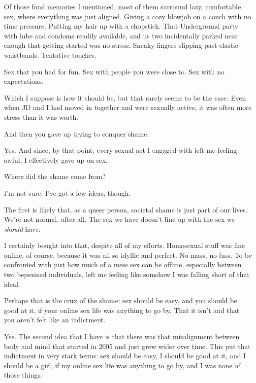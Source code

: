 Of those fond memories I mentioned, most of them surround lazy, comfortable sex, where everything was just aligned. Giving a cozy blowjob on a couch with no time pressure. Putting my hair up with a chopstick. That Underground party with lube and condoms readily available, and us two incidentally parked near enough that getting started was no stress. Sneaky fingers slipping past elastic waistbands. Tentative touches.

\begin{ally}
Sex that you had for fun. Sex with people you were close to. Sex with no expectations.
\end{ally}
Which I suppose is how it should be, but that rarely seems to be the case. Even when JD and I had moved in together and were sexually active, it was often more stress than it was worth.

\begin{ally}
And then you gave up trying to conquer shame.
\end{ally}
Yes. And since, by that point, every sexual act I engaged with left me feeling awful, I effectively gave up on sex.
\newpage

\begin{ally}
Where did the shame come from?
\end{ally}
I'm not sure. I've got a few ideas, though.

The first is likely that, as a queer person, societal shame is just part of our lives. We're not normal, after all. The sex we have doesn't line up with the sex we \emph{should} have.

I certainly bought into that, despite all of my efforts. Homosexual stuff was fine online, of course, because it was all so idyllic and perfect. No muss, no fuss. To be confronted with just how much of a mess sex can be offline, especially between two bepenised individuals, left me feeling like somehow I was falling short of that ideal.

\begin{ally}
Perhaps that is the crux of the shame: sex should be easy, and you should be good at it, if your online sex life was anything to go by. That it isn't and that you aren't felt like an indictment.
\end{ally}
Yes. The second idea that I have is that there was that misalignment between body and mind that started in 2005 and just grew wider over time. This put that indictment in very stark terms: sex should be easy, I should be good at it, and I should be a girl, if my online sex life was anything to go by, and I was none of those things.

